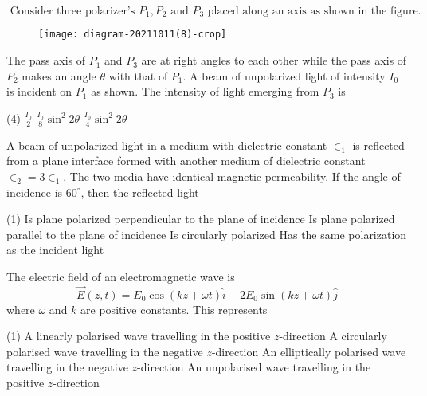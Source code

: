 \begin{enumerate}
\begin{minipage}{\textwidth}
	\item $\text { Consider three polarizer's } P_{1}, P_{2} \text { and } P_{3} \text { placed along an axis as shown in the figure. }$\\
	\begin{figure}[H]
		\centering
		\texttt{[image: diagram-20211011(8)-crop]}
	\end{figure}
	The pass axis of $P_{1}$ and $P_{3}$ are at right angles to each other while the pass axis of $P_{2}$ makes an angle $\theta$ with that of $P_{1}$. A beam of unpolarized light of intensity $I_{0}$ is incident on $P_{1}$ as shown. The intensity of light emerging from $P_{3}$ is
\end{minipage}
\begin{tasks}(4)
	\task[\textbf{B.}] $\frac{I_{0}}{2}$
	\task[\textbf{C.}]$\frac{I_{0}}{8} \sin ^{2} 2 \theta$
	\task[\textbf{D.}]$\frac{I_{0}}{4} \sin ^{2} 2 \theta$
\end{tasks}
\begin{minipage}{\textwidth}
	\item A beam of unpolarized light in a medium with dielectric constant $\in_{1}$ is reflected from a plane interface formed with another medium of dielectric constant $\in_{2}=3 \in_{1}$. The two media have identical magnetic permeability. If the angle of incidence is $60^{\circ}$, then the reflected light
\end{minipage}
\begin{tasks}(1)
	\task[\textbf{A.}] Is plane polarized perpendicular to the plane of incidence
	\task[\textbf{B.}] Is plane polarized parallel to the plane of incidence
	\task[\textbf{C.}]Is circularly polarized
	\task[\textbf{D.}] Has the same polarization as the incident light
\end{tasks}
\begin{minipage}{\textwidth}
	\item The electric field of an electromagnetic wave is
	$$
	\vec{E}(z, t)=E_{0} \cos (k z+\omega t) \hat{i}+2 E_{0} \sin (k z+\omega t) \hat{j}
	$$
	where $\omega$ and $k$ are positive constants. This represents
\end{minipage}
\begin{tasks}(1)
	\task[\textbf{A.}] A linearly polarised wave travelling in the positive $z$-direction
	\task[\textbf{B.}]A circularly polarised wave travelling in the negative $z$-direction
	\task[\textbf{C.}]An elliptically polarised wave travelling in the negative $z$-direction
	\task[\textbf{D.}]An unpolarised wave travelling in the positive $z$-direction
\end{tasks}
\end{enumerate}
